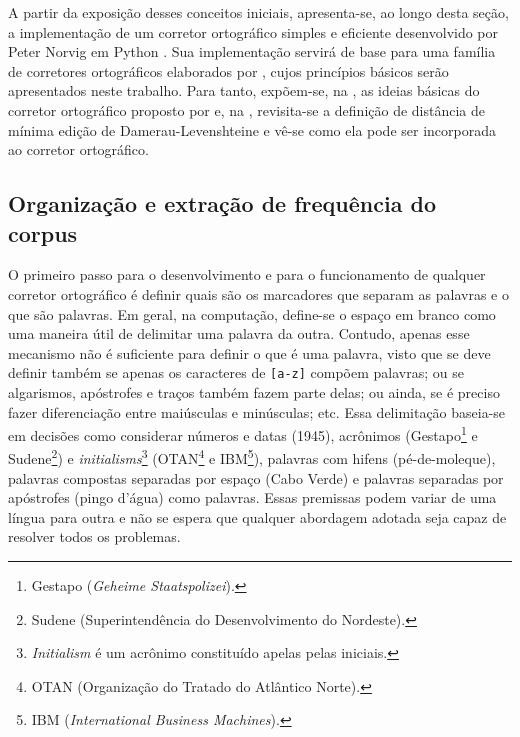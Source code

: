 \documentclass{textolivre}
\begin{document}
A partir da exposição desses conceitos iniciais, apresenta-se, ao longo desta seção,
a implementação de um corretor ortográfico simples
e eficiente desenvolvido por Peter Norvig em Python \cite{norvig2007}.
Sua implementação servirá de base para uma família de corretores ortográficos 
elaborados por \textcite{leolcaspell}, cujos princípios básicos serão apresentados
neste trabalho. Para tanto, expõem-se, na , as ideias básicas
do corretor ortográfico proposto por \textcite{norvig2007} e, na , 
revisita-se a definição de distância de mínima edição de Damerau-Levenshteine e vê-se como ela
pode ser incorporada ao corretor ortográfico.


\subsection{Organização e extração de
frequência do corpus}\label{sec-org}
O primeiro passo para o desenvolvimento e para o funcionamento de qualquer 
corretor ortográfico é definir quais são
os marcadores que separam as palavras e
o que são palavras. Em geral, na
computação, define-se o espaço em branco
como uma maneira útil de delimitar uma palavra
da outra. Contudo, apenas esse mecanismo
não é suficiente para definir o que é
uma palavra, visto que se deve definir
também se apenas os caracteres de
\texttt{[a-z]}
compõem palavras; ou se algarismos,
apóstrofes e traços também fazem parte
delas; ou ainda, se é preciso fazer diferenciação
entre maiúsculas e minúsculas; etc.
Essa delimitação baseia-se em decisões
como considerar números e datas (1945),
acrônimos (Gestapo\footnote{Gestapo
(\textit{Geheime Staatspolizei}).} e Sudene\footnote{Sudene (Superintendência do Desenvolvimento do Nordeste).}) 
e \textit{initialisms}\footnote{\textit{Initialism} é um acrônimo constituído apelas pelas iniciais.}
(OTAN\footnote{OTAN (Organização do Tratado do Atlântico Norte).} e IBM\footnote{IBM (\textit{International Business Machines}).}),
palavras com hifens (pé-de-moleque),
palavras compostas separadas por espaço (Cabo Verde) e palavras
separadas por apóstrofes (pingo d'água)
como palavras.
Essas premissas podem variar de uma língua para outra e não se espera que qualquer abordagem adotada
seja capaz de resolver todos os problemas. 
\end{document}
